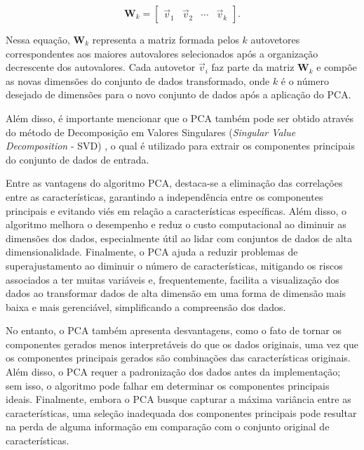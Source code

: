 \begin{enumerate}
    \begin{equation}
        \label{deep:eq:pca_5}
        \boldsymbol{W}_k = \begin{bmatrix} \overrightarrow{v}_1 & \overrightarrow{v}_2 & \cdots & \overrightarrow{v}_k \end{bmatrix}.
    \end{equation}

    Nessa equação, $\boldsymbol{W}_k$ representa a matriz formada pelos $k$ autovetores correspondentes aos maiores autovalores selecionados após a organização decrescente dos autovalores. Cada autovetor $\overrightarrow{v}_i$ faz parte da matriz $\boldsymbol{W}_k$ e compõe as novas dimensões do conjunto de dados transformado, onde $k$ é o número desejado de dimensões para o novo conjunto de dados após a aplicação do PCA.

    
\end{enumerate}

Além disso, é importante mencionar que o PCA também pode ser obtido através do método de Decomposição em Valores Singulares (\textit{Singular Value Decomposition} - SVD) \citep{Stewart2006OnDecomposition}, o qual é utilizado para extrair os componentes principais do conjunto de dados de entrada.

Entre as vantagens do algoritmo PCA, destaca-se a eliminação das correlações entre as características, garantindo a independência entre os componentes principais e evitando viés em relação a características específicas. Além disso, o algoritmo melhora o desempenho e reduz o custo computacional ao diminuir as dimensões dos dados, especialmente útil ao lidar com conjuntos de dados de alta dimensionalidade. Finalmente, o PCA ajuda a reduzir problemas de superajustamento ao diminuir o número de características, mitigando os riscos associados a ter muitas variáveis e, frequentemente, facilita a visualização dos dados ao transformar dados de alta dimensão em uma forma de dimensão mais baixa e mais gerenciável, simplificando a compreensão dos dados.

No entanto, o PCA também apresenta desvantagens, como o fato de tornar os componentes gerados menos interpretáveis do que os dados originais, uma vez que os componentes principais gerados são combinações das características originais. Além disso, o PCA requer a padronização dos dados antes da implementação; sem isso, o algoritmo pode falhar em determinar os componentes principais ideais. Finalmente, embora o PCA busque capturar a máxima variância entre as características, uma seleção inadequada dos componentes principais pode resultar na perda de alguma informação em comparação com o conjunto original de características.


